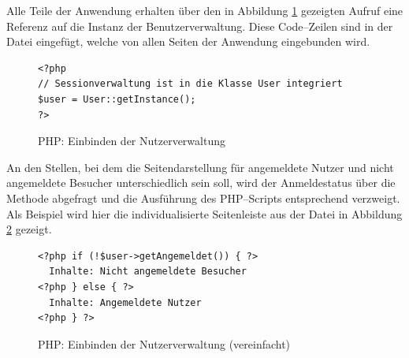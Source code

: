 Alle Teile der Anwendung erhalten über den in Abbildung \ref{php:getinstance} gezeigten Aufruf eine Referenz auf die Instanz der Benutzerverwaltung. Diese Code--Zeilen sind in der Datei  eingefügt, welche von allen Seiten der Anwendung eingebunden wird.

\begin{figure}[h]
\begin{spacing}{1.0}
\begin{verbatim}
<?php
// Sessionverwaltung ist in die Klasse User integriert
$user = User::getInstance(); 
?>
\end{verbatim}
\caption{PHP: Einbinden der Nutzerverwaltung}
\label{php:getinstance}
\end{spacing}
\end{figure}

An den Stellen, bei dem die Seitendarstellung für angemeldete Nutzer und nicht angemeldete Besucher unterschiedlich sein soll, wird der Anmeldestatus über die Methode  abgefragt und die Ausführung des PHP--Scripts entsprechend verzweigt. Als Beispiel wird hier die individualisierte Seitenleiste aus der Datei  in Abbildung \ref{php:angemeldet} gezeigt.

\begin{figure}[h]
\begin{spacing}{1.0}
\begin{verbatim}
<?php if (!$user->getAngemeldet()) { ?>
  Inhalte: Nicht angemeldete Besucher
<?php } else { ?>
  Inhalte: Angemeldete Nutzer
<?php } ?>
\end{verbatim}
\caption{PHP: Einbinden der Nutzerverwaltung (vereinfacht)}
\label{php:angemeldet}
\end{spacing}
\end{figure}
 